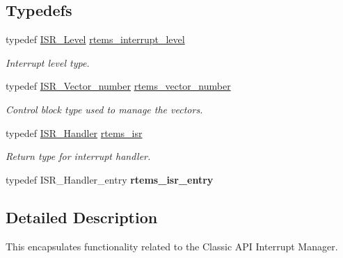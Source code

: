 \subsection*{Typedefs}
\begin{DoxyCompactItemize}
\item 
\mbox{\label{group__ClassicINTR_ga9d815b0efd1f51936bb180683f26c436}} 
typedef \mbox{\hyperlink{group__RTEMSScoreISR_gad1af728587ebcefec5b5cf94fc7909b9}{I\+S\+R\+\_\+\+Level}} \mbox{\hyperlink{group__ClassicINTR_ga9d815b0efd1f51936bb180683f26c436}{rtems\+\_\+interrupt\+\_\+level}}
\begin{DoxyCompactList}\small\item\em Interrupt level type. \end{DoxyCompactList}\item 
\mbox{\label{group__ClassicINTR_ga3e434c197d99f128e78cae4d9358bd8b}} 
typedef \mbox{\hyperlink{group__RTEMSScoreISR_gad594e7073b09d33d6b5d1dd2f313fb18}{I\+S\+R\+\_\+\+Vector\+\_\+number}} \mbox{\hyperlink{group__ClassicINTR_ga3e434c197d99f128e78cae4d9358bd8b}{rtems\+\_\+vector\+\_\+number}}
\begin{DoxyCompactList}\small\item\em Control block type used to manage the vectors. \end{DoxyCompactList}\item 
\mbox{\label{group__ClassicINTR_ga17fb491bd308ce6b1bf27a51dec0b46d}} 
typedef \mbox{\hyperlink{group__RTEMSScoreISR_ga49c3b0ab3e84ccac78941b867bf34ccf}{I\+S\+R\+\_\+\+Handler}} \mbox{\hyperlink{group__ClassicINTR_ga17fb491bd308ce6b1bf27a51dec0b46d}{rtems\+\_\+isr}}
\begin{DoxyCompactList}\small\item\em Return type for interrupt handler. \end{DoxyCompactList}\item 
\mbox{\label{group__ClassicINTR_ga00465b957fedb1e4f0f5130f3a2069ec}} 
typedef I\+S\+R\+\_\+\+Handler\+\_\+entry {\bfseries rtems\+\_\+isr\+\_\+entry}
\end{DoxyCompactItemize}


\subsection{Detailed Description}
This encapsulates functionality related to the Classic A\+PI Interrupt Manager. 


